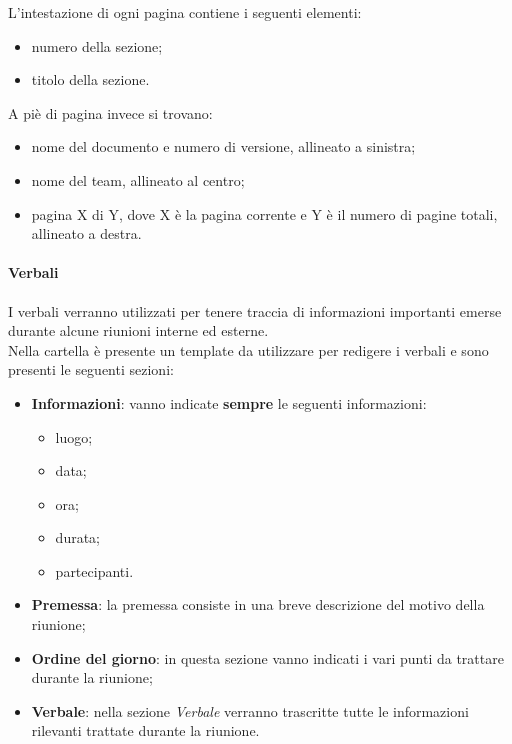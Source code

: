 		L'intestazione di ogni pagina contiene i seguenti elementi:
		\begin{itemize}
			\item numero della sezione;
			\item titolo della sezione.
		\end{itemize}
		A piè di pagina invece si trovano:
		\begin{itemize}
			\item nome del documento e numero di versione, allineato a sinistra;
			\item nome del team, allineato al centro;
			\item pagina X di Y, dove X è la pagina corrente e Y è il numero di pagine totali, allineato a destra.
		\end{itemize}
	
	\paragraph{Verbali}
	I verbali verranno utilizzati per tenere traccia di informazioni importanti emerse durante alcune riunioni interne ed esterne. \\
	Nella cartella  è presente un template da utilizzare per redigere i verbali e sono presenti le seguenti sezioni:
	\begin{itemize}
		\item \textbf{Informazioni}: vanno indicate \textbf{sempre} le seguenti informazioni:
		\begin{itemize}
			\item luogo;
			\item data;
			\item ora;
			\item durata;
			\item partecipanti.
		\end{itemize}
		\item \textbf{Premessa}: la premessa consiste in una breve descrizione del motivo della riunione;
		\item \textbf{Ordine del giorno}: in questa sezione vanno indicati i vari punti da trattare durante la riunione;
		\item \textbf{Verbale}: nella sezione \textit{Verbale} verranno trascritte tutte le informazioni rilevanti trattate durante la riunione.
	\end{itemize}	

